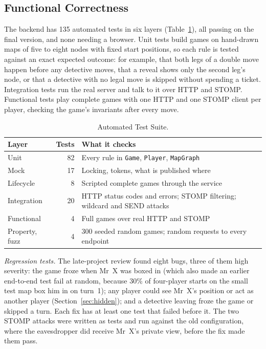 \documentclass[lettersize,journal]{IEEEtran}
\begin{document}
\subsection{Functional Correctness}\label{sec:correctness}
The backend has 135 automated tests in six layers (Table~\ref{tab:tests}), all passing on the final version, and none needing a browser. Unit tests build games on hand-drawn maps of five to eight nodes with fixed start positions, so each rule is tested against an exact expected outcome: for example, that both legs of a double move happen before any detective moves, that a reveal shows only the second leg's node, or that a detective with no legal move is skipped without spending a ticket. Integration tests run the real server and talk to it over HTTP and STOMP. Functional tests play complete games with one HTTP and one STOMP client per player, checking the game's invariants after every move.

\begin{table}[!t]
\caption{Automated Test Suite.}
\label{tab:tests}
\centering
\small
\begin{tabular}{@{}lrp{}@{}}
\toprule
Layer & Tests & What it checks \\
\midrule
Unit & 82 & Every rule in \texttt{Game}, \texttt{Player}, \texttt{MapGraph} \\
Mock & 17 & Locking, tokens, what is published where \\
Lifecycle & 8 & Scripted complete games through the service \\
Integration & 20 & HTTP status codes and errors; STOMP filtering; wildcard and SEND attacks \\
Functional & 4 & Full games over real HTTP and STOMP \\
Property, fuzz & 4 & 300 seeded random games; random requests to every endpoint \\
\bottomrule
\end{tabular}
\end{table}

\emph{Regression tests.} The late-project review found eight bugs, three of them high severity: the game froze when Mr~X was boxed in (which also made an earlier end-to-end test fail at random, because 30\% of four-player starts on the small test map box him in on turn~1); any player could see Mr~X's position or act as another player (Section~\ref{sec:hidden}); and a detective leaving froze the game or skipped a turn. Each fix has at least one test that failed before it. The two STOMP attacks were written as tests and run against the old configuration, where the eavesdropper did receive Mr~X's private view, before the fix made them pass.
\end{document}
